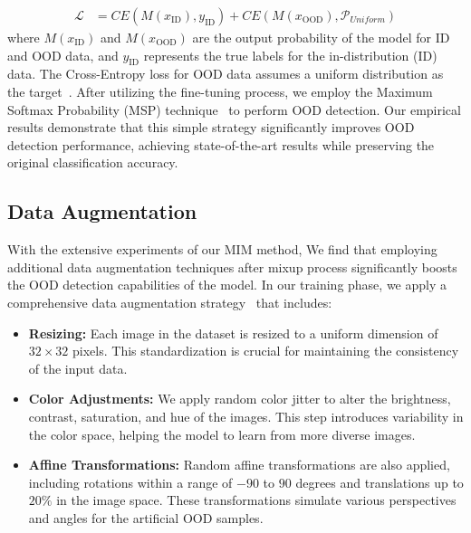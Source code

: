 \documentclass[letterpaper]{article} %
\begin{document}
\begin{align*}
    \mathcal{L} &= CE(M(x_{\text{ID}}), y_{\text{ID}}) + CE(M(x_{\text{OOD}}), \mathcal{P}_{Uniform})
\end{align*}
where $M(x_{\text{ID}})$ and $M(x_{\text{OOD}})$ are the output probability of the model for ID and OOD data, and $y_{\text{ID}}$ represents the true labels for the in-distribution (ID) data. The Cross-Entropy loss for OOD data assumes a uniform distribution as the target~\cite{uniform}.
After utilizing the fine-tuning process, we employ the Maximum Softmax Probability (MSP) technique~\cite{MSP} to perform OOD detection.
Our empirical results demonstrate that this simple strategy significantly improves OOD detection performance, achieving state-of-the-art results while preserving the original classification accuracy.

\subsection{Data Augmentation}
With the extensive experiments of our MIM method, We find that employing additional data augmentation techniques after mixup process significantly boosts the OOD detection capabilities of the model.
In our training phase, we apply a comprehensive data augmentation strategy~\cite{imagenet_aug} that includes:
\begin{itemize}
    \item \textbf{Resizing:} Each image in the dataset is resized to a uniform dimension of $32 \times 32$ pixels. This standardization is crucial for maintaining the consistency of the input data.
    \item \textbf{Color Adjustments:} We apply random color jitter to alter the brightness, contrast, saturation, and hue of the images. This step introduces variability in the color space, helping the model to learn from more diverse images.
    \item \textbf{Affine Transformations:} Random affine transformations are also applied, including rotations within a range of $-90$ to $90$ degrees and translations up to $20\%$ in the image space. These transformations simulate various perspectives and angles for the artificial OOD samples.
\end{itemize}
\end{document}
